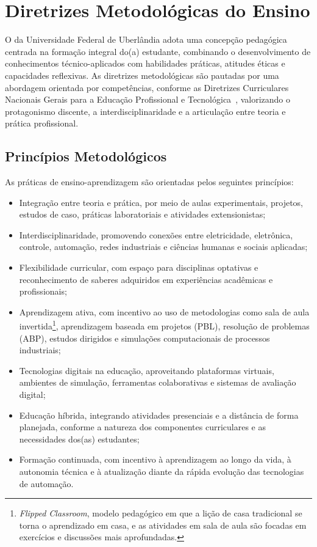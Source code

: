 \chapter{Diretrizes Metodológicas do Ensino}
\label{chp:diretrizes_pedagogicas}

O \ppccurso da Universidade Federal de Uberlândia adota uma concepção pedagógica centrada na formação integral do(a) estudante, combinando o desenvolvimento de conhecimentos técnico-aplicados com habilidades práticas, atitudes éticas e capacidades reflexivas. As diretrizes metodológicas são pautadas por uma abordagem orientada por competências, conforme as Diretrizes Curriculares Nacionais Gerais para a Educação Profissional e Tecnológica~\cite{cne_cp_1_2021}, valorizando o protagonismo discente, a interdisciplinaridade e a articulação entre teoria e prática profissional.

\section{Princípios Metodológicos}

As práticas de ensino-aprendizagem são orientadas pelos seguintes princípios:

\begin{itemize}
    \item Integração entre teoria e prática, por meio de aulas experimentais, projetos, estudos de caso, práticas laboratoriais e atividades extensionistas;
    \item Interdisciplinaridade, promovendo conexões entre eletricidade, eletrônica, controle, automação, redes industriais e ciências humanas e sociais aplicadas;
    \item Flexibilidade curricular, com espaço para disciplinas optativas e reconhecimento de saberes adquiridos em experiências acadêmicas e profissionais;
    \item Aprendizagem ativa, com incentivo ao uso de metodologias como sala de aula invertida\footnote{\textit{Flipped Classroom}, modelo pedagógico em que a lição de casa tradicional se torna o aprendizado em casa, e as atividades em sala de aula são focadas em exercícios e discussões mais aprofundadas.}, aprendizagem baseada em projetos (PBL), resolução de problemas (ABP), estudos dirigidos e simulações computacionais de processos industriais;
    \item Tecnologias digitais na educação, aproveitando plataformas virtuais, ambientes de simulação, ferramentas colaborativas e sistemas de avaliação digital;
    \item Educação híbrida, integrando atividades presenciais e a distância de forma planejada, conforme a natureza dos componentes curriculares e as necessidades dos(as) estudantes;
    \item Formação continuada, com incentivo à aprendizagem ao longo da vida, à autonomia técnica e à atualização diante da rápida evolução das tecnologias de automação.
\end{itemize}

